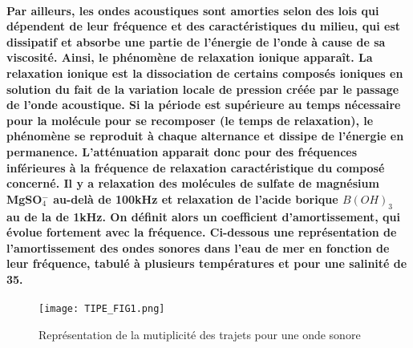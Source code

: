 \documentclass[a4paper,11pt]{article}
\begin{document}
\paragraph{\normalfont Par ailleurs, les ondes acoustiques sont amorties selon des lois qui d\'{e}pendent de leur fr\'{e}quence et des caract\'{e}ristiques du milieu, qui est dissipatif et absorbe une partie de l'\'{e}nergie de l'onde \`{a} cause de sa viscosit\'{e}. Ainsi, le ph\'{e}nom\`{e}ne de \textbf{relaxation ionique} appara\^{i}t. La relaxation ionique est la \textbf{dissociation de certains compos\'{e}s ioniques en solution du fait de la variation locale de pression cr\'{e}\'{e}e par le passage de l'onde acoustique}. Si la p\'{e}riode est sup\'{e}rieure au temps n\'{e}cessaire pour la mol\'{e}cule pour se recomposer (le temps de relaxation), le ph\'{e}nom\`{e}ne se reproduit \`{a} chaque alternance et \textbf{dissipe de l'\'{e}nergie en permanence}. L'att\'{e}nuation apparait donc pour des fr\'{e}quences inf\'{e}rieures \`{a} la fr\'{e}quence de relaxation caract\'{e}ristique du compos\'{e} concern\'{e}. Il y a relaxation des mol\'{e}cules de sulfate de magn\'{e}sium MgSO$_4^-$ au-del\`{a} de 100kHz et relaxation de l'acide borique $B(OH)_3$ au de la de 1kHz.\newline \newline
On d\'{e}finit alors un coefficient d'amortissement, qui \'{e}volue fortement avec la fr\'{e}quence. Ci-dessous une repr\'{e}sentation de l'amortissement des ondes sonores dans l'eau de mer en fonction de leur fr\'{e}quence, tabul\'{e} \`{a} plusieurs temp\'{e}ratures et pour une salinit\'{e} de 35\textperthousand.}
\begin{figure}[!h] %
\texttt{[image: TIPE\_FIG1.png]} %
\caption{Repr\'{e}sentation de la mutiplicit\'{e} des trajets pour une onde sonore} %
\label{fig_1} %
\end{figure}
\end{document}
